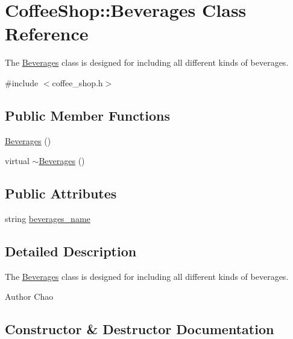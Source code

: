\hypertarget{classCoffeeShop_1_1Beverages}{}\section{Coffee\+Shop\+:\+:Beverages Class Reference}
\label{classCoffeeShop_1_1Beverages}


The \hyperlink{classCoffeeShop_1_1Beverages}{Beverages} class is designed for including all different kinds of beverages.  




{\ttfamily \#include $<$coffee\+\_\+shop.\+h$>$}

\subsection*{Public Member Functions}
\begin{DoxyCompactItemize}
\item 
\hyperlink{classCoffeeShop_1_1Beverages_a92831946cf66fe3fe4fb28a35c96766a}{Beverages} ()
\item 
virtual \hyperlink{classCoffeeShop_1_1Beverages_abfe1a22e67cd6937aaa5f7d8e108736a}{$\sim$\+Beverages} ()
\end{DoxyCompactItemize}
\subsection*{Public Attributes}
\begin{DoxyCompactItemize}
\item 
string \hyperlink{classCoffeeShop_1_1Beverages_a45cca22d1a51cc3dc57efc3615ea04c5}{beverages\+\_\+name}
\end{DoxyCompactItemize}


\subsection{Detailed Description}
The \hyperlink{classCoffeeShop_1_1Beverages}{Beverages} class is designed for including all different kinds of beverages. 

\begin{DoxyAuthor}{Author}
Chao 
\end{DoxyAuthor}


\subsection{Constructor \& Destructor Documentation}
